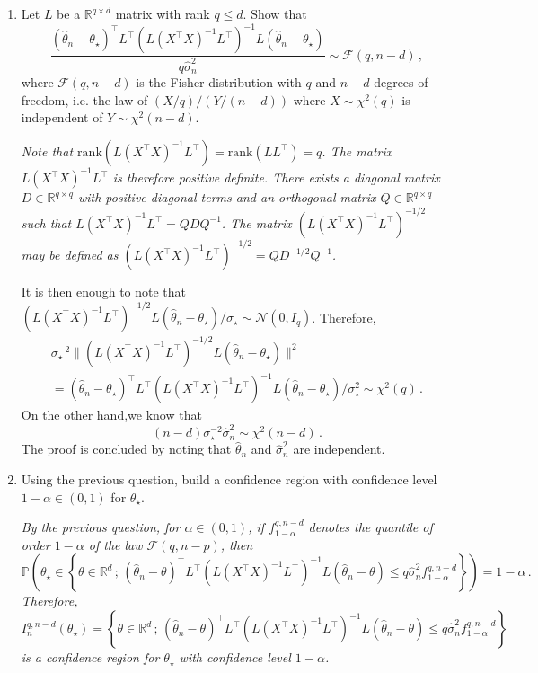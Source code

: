 \documentclass[a4paper,10pt,fleqn]{article}
\newcommand{\eqsp}{\,}
\newcommand{\rset}{\ensuremath{\mathbb{R}}}
\newcommand{\bP}{\mathbb{P}}
\newcommand{\1}{\ensuremath{\mathbbm{1}}}
\newcommand{\param}{\theta}
\begin{document}
\begin{enumerate}
\item  Let $L$ be a $\rset^{q\times d}$ matrix with rank $q\leqslant d$. Show that
$$
\frac{(\widehat \param_{n} -\param_{\star})^\top L^\top(L(X^\top X)^{-1}L^\top)^{-1}L(\widehat \param_{n} -\param_{\star})}{q\widehat\sigma^2_{n}} \sim \mathcal{F}(q,n-d)\eqsp,
$$
where $\mathcal{F}(q,n-d)$ is the Fisher distribution with $q$ and $n-d$ degrees of freedom, i.e. the law of $(X/q)/(Y/(n-d))$ where $X\sim\chi^2(q)$ is independent of $Y\sim\chi^2(n-d)$.

\vspace{.2cm}

{\em
Note that $\mathrm{rank}(L(X^\top X)^{-1}L^\top) = \mathrm{rank}(LL^\top)  = q$. The matrix $L(X^\top X)^{-1}L^\top$ is therefore positive definite. There exists a diagonal matrix $D\in\rset^{q\times q}$ with positive diagonal terms and an orthogonal matrix $Q\in\rset^{q\times q}$ such that $L(X^\top X)^{-1}L^\top = QDQ^{-1}$. The matrix $(L(X^\top X)^{-1}L^\top)^{-1/2}$ may be defined as $(L(X^\top X)^{-1}L^\top)^{-1/2} = QD^{-1/2}Q^{-1}$. 

It is then enough to note that $(L(X^\top X)^{-1}L^\top)^{-1/2}L(\widehat \param_{n} -\param_{\star})/\sigma_{\star}\sim \mathcal{N}(0,I_q)$. Therefore,
\begin{multline*}
\sigma^{-2}_{\star}\|(L(X^\top X)^{-1}L^\top)^{-1/2}L(\widehat \param_{n} -\param_{\star})\|^2 \\
= (\widehat \param_{n} -\param_{\star})^\top L^\top(L(X^\top X)^{-1}L^\top)^{-1}L(\widehat \param_{n} -\param_{\star})/\sigma^2_{\star} \sim \chi^2(q)\eqsp.
\end{multline*}
On the other hand,we know that 
$$
(n-d)\sigma^{-2}_{\star}\widehat\sigma^2_{n} \sim \chi^2(n-d)\eqsp.
$$
The proof is concluded by noting that $\widehat \param_n$ and  $\widehat\sigma^2_{n}$ are independent.
}
\item Using the previous question, build a confidence region with confidence level $1-\alpha\in(0,1)$ for $\param_\star$.

\vspace{.2cm}

{\em
By the previous question, for $\alpha\in(0,1)$, if $f_{1-\alpha}^{q,n-d}$ denotes the quantile of order $1-\alpha$ of the law $\mathcal{F}(q,n-p)$, then 
\[
\bP\left(\param_{\star}\in \left\{\param\in\rset^d\eqsp;\eqsp (\widehat \param_{n} -\param)^\top L^\top(L(X^\top X)^{-1}L^\top)^{-1}L(\widehat \param_{n} -\param)\leqslant q\widehat\sigma^2_{n}f_{1-\alpha}^{q,n-d}\right\}\right) = 1-\alpha\eqsp.
\]
Therefore, 
\[
I^{q,n-d}_{n}(\param_{\star}) = \left\{\param\in\rset^d\eqsp;\eqsp (\widehat \param_{n} -\param)^\top L^\top(L(X^\top X)^{-1}L^\top)^{-1}L(\widehat \param_{n} -\param)\leqslant q\widehat\sigma^2_{n}f_{1-\alpha}^{q,n-d}\right\}
\]
 is a confidence region for $\param_{\star}$ with confidence level $1-\alpha$. 
}
\end{enumerate}
\end{document}
